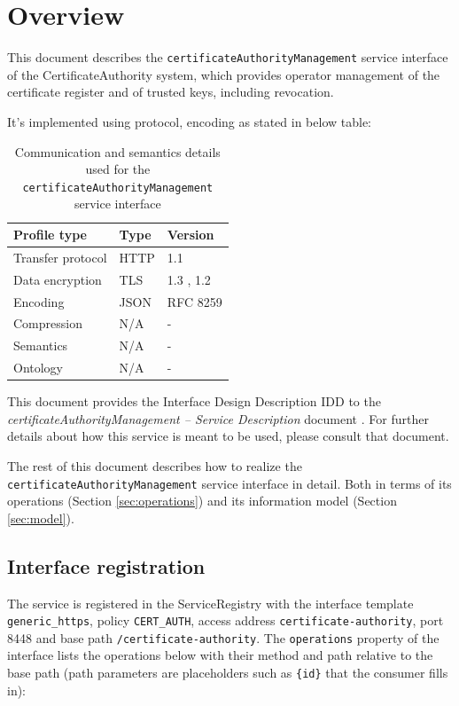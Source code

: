 \documentclass[a4paper]{arrowhead}
\begin{document}
\section{Overview}
\label{sec:overview}

This document describes the \texttt{certificate\allowbreak{}Authority\allowbreak{}Management} service interface of the CertificateAuthority system, which provides operator management of the certificate register and of trusted keys, including revocation.

It's implemented using protocol, encoding as stated in below table:
\begin{table}[ht!]
  \centering
  \begin{tabular}{|l|l|l|}
    \hline
    \rowcolor{gray!33} Profile type & Type & Version \\ \hline
    Transfer protocol & HTTP & 1.1 \cite{rfc9112} \\ \hline
    Data encryption & TLS & 1.3 \cite{rfc8446}, 1.2 \cite{rfc5246} \\ \hline
    Encoding & JSON & RFC 8259 \cite{rfc8259} \\ \hline
    Compression & N/A & - \\ \hline
    Semantics & N/A & - \\ \hline
    Ontology & N/A & - \\ \hline
  \end{tabular}
  \caption{Communication and semantics details used for the \texttt{certificate\allowbreak{}Authority\allowbreak{}Management} service interface}
  \label{tab:comunication_semantics_profile}
\end{table}

This document provides the Interface Design Description IDD to the \textit{certificateAuthorityManagement -- Service Description} document \cite{cau-certificateAuthorityManagement-sd}.
For further details about how this service is meant to be used, please consult that document.

The rest of this document describes how to realize the \texttt{certificate\allowbreak{}Authority\allowbreak{}Management} service
interface in detail. Both in terms of its operations (Section \ref{sec:operations}) and its information model (Section \ref{sec:model}).

\subsection{Interface registration}

The service is registered in the ServiceRegistry with the interface template \texttt{generic\_\allowbreak{}https}, policy \texttt{CERT\_\allowbreak{}AUTH}, access address \texttt{certificate-\allowbreak{}authority}, port 8448 and base path \texttt{/\allowbreak{}certificate-\allowbreak{}authority}. The \texttt{operations} property of the interface lists the operations below with their method and path relative to the base path (path parameters are placeholders such as \texttt{\{id\}} that the consumer fills in):
\end{document}

